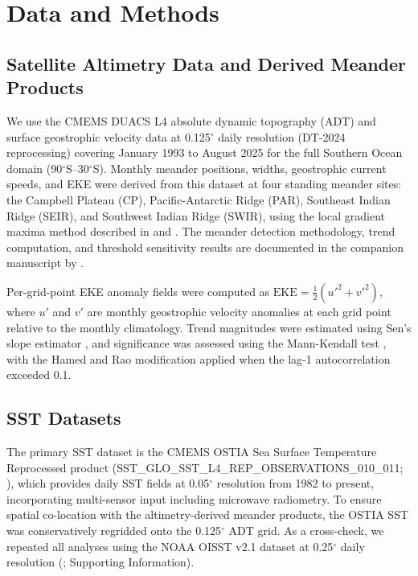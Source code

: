 \documentclass[draft]{agujournal2019}
\begin{document}
\section{Data and Methods}

\subsection{Satellite Altimetry Data and Derived Meander Products}

We use the CMEMS DUACS L4 absolute dynamic topography (ADT) and surface geostrophic velocity data at 0.125$^{\circ}$ daily resolution (DT-2024 reprocessing) covering January 1993 to August 2025 \cite{cmems_quid2025} for the full Southern Ocean domain (90$^{\circ}$S--30$^{\circ}$S).
Monthly meander positions, widths, geostrophic current speeds, and EKE were derived from this dataset at four standing meander sites: the Campbell Plateau (CP), Pacific-Antarctic Ridge (PAR), Southeast Indian Ridge (SEIR), and Southwest Indian Ridge (SWIR), using the local gradient maxima method described in  and .
The meander detection methodology, trend computation, and threshold sensitivity results are documented in the companion manuscript by .


Per-grid-point EKE anomaly fields were computed as $\mathrm{EKE} = \frac{1}{2}(u'^{2} + v'^{2})$, where $u'$ and $v'$ are monthly geostrophic velocity anomalies at each grid point relative to the monthly climatology.
Trend magnitudes were estimated using Sen's slope estimator \cite{sen1968estimates}, and significance was assessed using the Mann-Kendall test \cite{mann1945nonparametric}, with the Hamed and Rao modification \cite{hamed1998modified} applied when the lag-1 autocorrelation exceeded 0.1.


\subsection{SST Datasets}

The primary SST dataset is the CMEMS OSTIA Sea Surface Temperature Reprocessed product (SST\_GLO\_SST\_L4\_REP\_OBSERVATIONS\_010\_011; ), which provides daily SST fields at 0.05$^{\circ}$ resolution from 1982 to present, incorporating multi-sensor input including microwave radiometry.
To ensure spatial co-location with the altimetry-derived meander products, the OSTIA SST was conservatively regridded onto the 0.125$^{\circ}$ ADT grid.
As a cross-check, we repeated all analyses using the NOAA OISST v2.1 dataset at 0.25$^{\circ}$ daily resolution (; Supporting Information).
\end{document}
